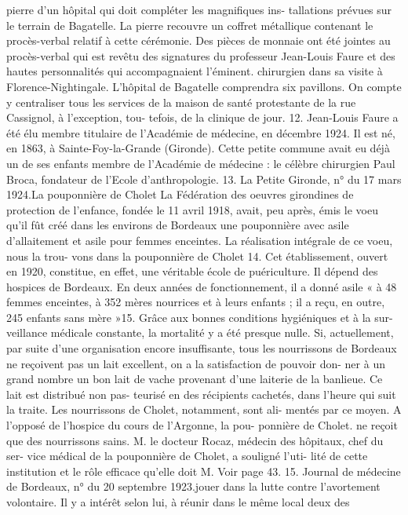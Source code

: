 \documentclass[a4paper,11pt]{book}
\begin{document}
pierre d'un hôpital qui doit compléter les magnifiques ins-
tallations prévues sur le terrain de Bagatelle. La pierre
recouvre un coffret métallique contenant le procès-verbal
relatif à cette cérémonie. Des pièces de monnaie ont été
jointes au procès-verbal qui est revêtu des signatures du
professeur Jean-Louis Faure et des hautes personnalités
qui accompagnaient l'éminent. chirurgien dans sa visite
à Florence-Nightingale.
L'hôpital de Bagatelle comprendra six pavillons. On
compte y centraliser tous les services de la maison de
santé protestante de la rue Cassignol, à l'exception, tou-
tefois, de la clinique de jour.
12. Jean-Louis Faure a été élu membre titulaire de l'Académie de
médecine, en décembre 1924. Il est né, en 1863, à Sainte-Foy-la-Grande
(Gironde). Cette petite commune avait eu déjà un de ses enfants membre
de l'Académie de médecine : le célèbre chirurgien Paul Broca, fondateur
de l'Ecole d'anthropologie.
13. La Petite Gironde, n° du 17 mars 1924.La pouponnière de Cholet
La Fédération des oeuvres girondines de protection de
l'enfance, fondée le 11 avril 1918, avait, peu après, émis
le voeu qu'il fût créé dans les environs de Bordeaux une
pouponnière avec asile d'allaitement et asile pour femmes
enceintes. La réalisation intégrale de ce voeu, nous la trou-
vons dans la pouponnière de Cholet 14. Cet établissement,
ouvert en 1920, constitue, en effet, une véritable école de
puériculture. Il dépend des hospices de Bordeaux. En deux
années de fonctionnement, il a donné asile « à 48 femmes
enceintes, à 352 mères nourrices et à leurs enfants ; il a
reçu, en outre, 245 enfants sans mère »15.
Grâce aux bonnes conditions hygiéniques et à la sur-
veillance médicale constante, la mortalité y a été presque
nulle.
Si, actuellement, par suite d'une organisation encore
insuffisante, tous les nourrissons de Bordeaux ne reçoivent
pas un lait excellent, on a la satisfaction de pouvoir don-
ner à un grand nombre un bon lait de vache provenant
d'une laiterie de la banlieue. Ce lait est distribué non pas-
teurisé en des récipients cachetés, dans l'heure qui suit
la traite. Les nourrissons de Cholet, notamment, sont ali-
mentés par ce moyen.
A l'opposé de l'hospice du cours de l'Argonne, la pou-
ponnière de Cholet. ne reçoit que des nourrissons sains.
M. le docteur Rocaz, médecin des hôpitaux, chef du ser-
vice médical de la pouponnière de Cholet, a souligné l'uti-
lité de cette institution et le rôle efficace qu'elle doit
M. Voir page 43.
15. Journal de médecine de Bordeaux, n° du 20 septembre 1923.jouer dans la lutte contre l'avortement volontaire. Il y a
intérêt selon lui, à réunir dans le même local deux des
\end{document}
